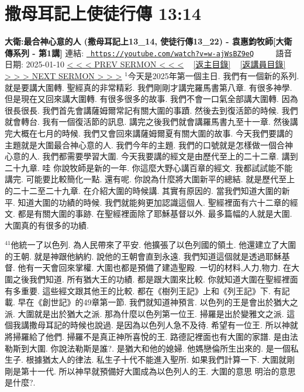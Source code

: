 \documentclass{book}
\begin{document}
\section{撒母耳記上使徒行傳 13:14}
\label{sec:w_ajWsBZ9eQ}
\textbf{大衛:最合神心意的人 (撒母耳記上13\_14, 使徒行傳13\_22) - 袁惠鈞牧師[大衛傳系列 - 第1講]}
\newline
\newline
連結: \href{https://youtube.com/watch?v=w-ajWsBZ9eQ}{\texttt{ https://youtube.com/watch?v=w-ajWsBZ9eQ}} ~~~~ 語音日期: 2025-01-10 
\newline
\newline
\hyperref[sec:9ORA5941xxk]{< < < PREV SERMON < < <}
~
\hyperlink{toc}{[返主目錄]}
~
\hyperref[ch:preacher6]{[返講員目錄]}
~
\hyperref[sec:yRzXvTTOZfM]{> > > NEXT SERMON > > >}
\newline
\newline
$^{1}$今天是2025年第一個主日.
我們有一個新的系列.
就是要講大圍轉.
聖經真的非常精彩.
我們剛剛才講完羅馬書第八章.
有很多神學.
但是現在又回來講大圍轉.
有很多很多的故事.
我們不會一口氣全部講大圍轉.
因為很長很長.
我們首先會講薩姆爾常記有關大圍的事蹟.
然後去到復活節的時候.
我們就會轉台.
我有一個復活節的訊息.
講完之後我們就會講羅馬書九至十一章.
然後講完大概在七月的時候.
我們又會回來講薩姆爾夏有關大圍的故事.
今天我們要講的主題就是大圍最合神心意的人.
我們今年的主題.
我們的口號就是怎樣做一個合神心意的人.
我們都需要學習大圍.
今天我要講的經文是由歷代至上的二十二章.
講到二十九章.
哇 你說牧師是新的一年.
你這麼大野心講百章的經文.
我都試試能不能講完.
可能要比較簡化一點.
還有呢.
你說為什麼將大圍新平的總結.
就是歷代至上的二十二至二十九章.
在介紹大圍的時候講.
其實有原因的.
當我們知道大圍的新平.
知道大圍的功績的時候.
我們就能夠更加認識這個人.
聖經裡面有六十二章的經文.
都是有關大圍的事跡.
在聖經裡面除了耶穌基督以外.
最多篇幅的人就是大圍.
大圍真的有很多的功績.

$^{41}$他統一了以色列.
為人民帶來了平安.
他擴張了以色列國的領土.
他還建立了大圍的王朝.
就是神跟他納約.
說他的王朝會直到永遠.
我們知道這個就是透過耶穌基督.
他有一天會回來掌權.
大圍也都是預備了建造聖殿.
一切的材料,人力,物力.
在大圍之後我們知道.
所有猶大王的功績.
都是跟大圍來比較.
你就知道大圍在聖經裡面有多重要.
這些經文跟其他王的比較.
都在《樹列王記》上和《列王記》下.
有記載.
早在《創世記》的49章第一節.
我們就知道神預言.
以色列的王是會出於猶大之派.
大圍就是出於猶大之派.
那為什麼以色列第一位王.
掃羅是出於變雅文之派.
這個我講撒母耳記的時候也說過.
是因為以色列人急不及待.
希望有一位王.
所以神就將掃羅給了他們.
掃羅不是真正神所喜悅的王.
路德記裡面也有大圍的家譜.
是由法勒斯到大圍.
你說法勒斯是誰?.
是猶大和他的媳婦.
他媽戀倫所生出來的.
是一個私生子.
根據猶太人的律法.
私生子十代不能進入聖所.
如果我們計算一下.
大圍就剛剛是第十一代.
所以神早就預備好大圍成為以色列人的王.
大圍的意思 明治的意思是什麼?.
\end{document}
